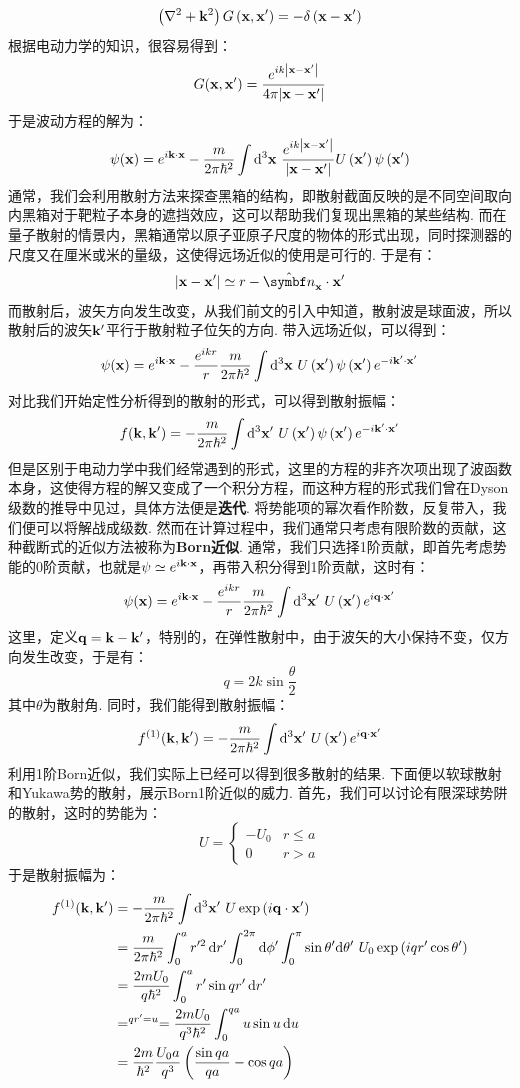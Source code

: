 \[
\left({\nabla^2 + \mathbf{k}^{2}}\right)G\left({\mathbf{x},\mathbf{x}'}\right) = - \delta\left({\mathbf{x} - \mathbf{x}'}\right)
\]
根据电动力学的知识，很容易得到：
\[
G(\mathbf{x},\mathbf{x}') = \frac{e^{ik\abs{\mathbf{x} - \mathbf{x}'}}}{4\pi\abs{\mathbf{x} - \mathbf{x}'}}
\]
于是波动方程的解为：
\[
\psi(\vr) = e^{i\vk\cdot\vr} - \frac{m}{2\pi\hh^{2}}\int\dd^{3}\vr\ \frac{e^{ik\abs{\vr-\vr'}}}{\abs{\vr - \vr'}}U\br{\vr'}\psi\br{\vr'}
\]
通常，我们会利用散射方法来探查黑箱的结构，即散射截面反映的是不同空间取向内黑箱对于靶粒子本身的遮挡效应，这可以帮助我们复现出黑箱的某些结构. 而在量子散射的情景内，黑箱通常以原子亚原子尺度的物体的形式出现，同时探测器的尺度又在厘米或米的量级，这使得远场近似的使用是可行的. 于是有：
\[
\abs{\vr - \vr'} \simeq r - \uv{n}_{\vr}\cdot\vr'
\]
而散射后，波矢方向发生改变，从我们前文的引入中知道，散射波是球面波，所以散射后的波矢\(\mathbf{k}'\)平行于散射粒子位矢的方向. 带入远场近似，可以得到：
\[
\psi(\vr) = e^{i\vk\cdot\vr} - \frac{e^{ikr}}{r}\frac{m}{2\pi\hh^{2}}\int\dd^{3}\vr\ U\br{\vr'}\psi\br{\vr'}e^{-i\vk'\cdot\vr'}
\]
对比我们开始定性分析得到的散射的形式，可以得到散射振幅：
\[
f(\vk,\vk') = -\frac{m}{2\pi\hh^{2}}\int\dd^{3}\vr'\ U\br{\vr'}\psi\br{\vr'}e^{-i\vk'\cdot\vr'}
\]
但是区别于电动力学中我们经常遇到的形式，这里的方程的非齐次项出现了波函数本身，这使得方程的解又变成了一个积分方程，而这种方程的形式我们曾在Dyson级数的推导中见过，具体方法便是\textbf{迭代}. 将势能项的幂次看作阶数，反复带入，我们便可以将解战成级数. 然而在计算过程中，我们通常只考虑有限阶数的贡献，这种截断式的近似方法被称为\textbf{Born近似}. 通常，我们只选择1阶贡献，即首先考虑势能的0阶贡献，也就是\(\psi\simeq e^{i\mathbf{k}\cdot\mathbf{x}}\)，再带入积分得到1阶贡献，这时有：
\[
\psi(\vr) = e^{i\vk\cdot\vr} - \frac{e^{ikr}}{r}\frac{m}{2\pi\hh^{2}}\int\dd^{3}\vr'\ U\br{\vr'}e^{i\vq\cdot\vr'}
\]
这里，定义\(\mathbf{q} = \mathbf{k} - \mathbf{k}'\)，特别的，在弹性散射中，由于波矢的大小保持不变，仅方向发生改变，于是有：
\[
q = 2k\sin\frac{\theta}{2}
\]
其中\(\theta\)为散射角. 同时，我们能得到散射振幅：
\[
f^{(1)}(\vk,\vk') = -\frac{m}{2\pi\hh^{2}}\int\dd^{3}\vr'\ U\br{\vr'}e^{i\vq\cdot\vr'}
\]
利用1阶Born近似，我们实际上已经可以得到很多散射的结果. 下面便以软球散射和Yukawa势的散射，展示Born1阶近似的威力. 首先，我们可以讨论有限深球势阱的散射，这时的势能为：
\[
U = 
\begin{cases}
-U_{0} & r\leq a \\
0 & r > a
\end{cases}
\]
于是散射振幅为：
\begin{align*}
f^{(1)}(\vk,\vk')
& = -\frac{m}{2\pi\hh^{2}}\int\dd^{3}\vr'\ U\exp\br{i\vq\cdot\vr'} \\
& = \frac{m}{2\pi\hh^{2}}\int_{0}^{a}r'^{2}\dd{r}'\int_{0}^{2\pi}\dd\phi'\int_{0}^{\pi}\sin\theta'\dd\theta'\ U_{0}\exp\br{iqr'\cos\theta'} \\\
& = \frac{2mU_{0}}{q\hh^{2}}\int_{0}^{a}r'\sin qr'\dd{r}' \\
& =^{qr'=u}= \frac{2mU_{0}}{q^{3}\hh^{2}}\int_{0}^{qa}u\sin{u}\dd{u} \\
& = \frac{2m}{\hh^{2}}\frac{U_{0}a}{q^{3}}\br{\frac{\sin qa}{qa} - \cos qa}
\end{align*}
